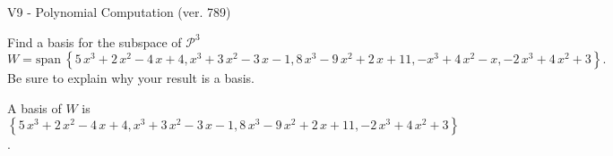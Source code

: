 \begin{exercise}
  \begin{exerciseTitle}V9 - Polynomial Computation (ver. 789)\end{exerciseTitle}
  \begin{exerciseStatement}
    Find a basis for the subspace of \(\mathcal{P}^3\) 
\[W=\mathrm{span}\ \left\{5 \, x^{3} + 2 \, x^{2} - 4 \, x + 4 , x^{3} + 3 \, x^{2} - 3 \, x - 1 , 8 \, x^{3} - 9 \, x^{2} + 2 \, x + 11 , -x^{3} + 4 \, x^{2} - x , -2 \, x^{3} + 4 \, x^{2} + 3\right\}.\]
 Be sure to explain why your result is a basis.


  \end{exerciseStatement}
  \begin{exerciseAnswer}
   A basis of \(W\) is  \(\left\{5 \, x^{3} + 2 \, x^{2} - 4 \, x + 4 , x^{3} + 3 \, x^{2} - 3 \, x - 1 , 8 \, x^{3} - 9 \, x^{2} + 2 \, x + 11 , -2 \, x^{3} + 4 \, x^{2} + 3\right\}\).
  


  \end{exerciseAnswer}
\end{exercise}